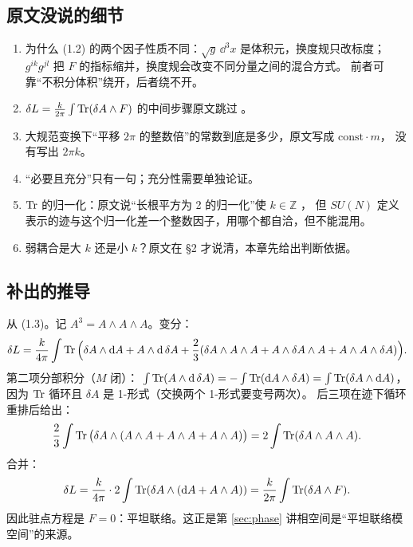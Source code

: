 \subsection{原文没说的细节}
\begin{enumerate}[label=G2.\arabic*,leftmargin=*]
  \item 为什么 (1.2) 的两个因子性质不同：$\sqrt g\,\dd^3x$ 是体积元，换度规只改标度；
        $g^{ik}g^{jl}$ 把 $F$ 的指标缩并，换度规会改变不同分量之间的混合方式。
        前者可靠“不积分体积”绕开，后者绕不开。\ours
  \item $\delta L=\frac{k}{2\pi}\int\operatorname{Tr}(\delta A\wedge F)$ 的中间步骤原文跳过 。
  \item 大规范变换下“平移 $2\pi$ 的整数倍”的常数到底是多少，原文写成 $\text{const}\cdot m$，
        没有写出 $2\pi k$。\ours
  \item “必要且充分”只有一句；充分性需要单独论证。
  \item $\operatorname{Tr}$ 的归一化：原文说“长根平方为 2 的归一化”使 $k\in\mathbb Z$ ，
        但 $SU(N)$ 定义表示的迹与这个归一化差一个整数因子，用哪个都自洽，但不能混用。
  \item 弱耦合是大 $k$ 还是小 $k$？原文在 \S2 才说清，本章先给出判断依据。
\end{enumerate}

\subsection{补出的推导}

\begin{derivation}[D-2.1：变分]
从 (1.3)。记 $A^3=A\wedge A\wedge A$。变分：
\[
\delta L=\frac{k}{4\pi}\int\operatorname{Tr}\Big(\delta A\wedge \mathrm{d} A+A\wedge \mathrm{d}\,\delta A
+\frac23(\delta A\wedge A\wedge A+A\wedge\delta A\wedge A+A\wedge A\wedge\delta A)\Big).
\]
第二项分部积分（$M$ 闭）：
$\int\operatorname{Tr}(A\wedge\mathrm{d}\,\delta A)=-\int\operatorname{Tr}(\mathrm{d} A\wedge\delta A)=\int\operatorname{Tr}(\delta A\wedge\mathrm{d} A)$，
因为 $\operatorname{Tr}$ 循环且 $\delta A$ 是 1-形式（交换两个 1-形式要变号两次）。
后三项在迹下循环重排后给出：
\[
\frac23\int\operatorname{Tr}\big(\delta A\wedge(A\wedge A+A\wedge A+A\wedge A)\big)
=2\int\operatorname{Tr}(\delta A\wedge A\wedge A).
\]
合并：
\[
\delta L=\frac{k}{4\pi}\cdot 2\int\operatorname{Tr}(\delta A\wedge(\mathrm{d} A+A\wedge A))
=\frac{k}{2\pi}\int\operatorname{Tr}(\delta A\wedge F).
\]
因此驻点方程是 $F=0$：平坦联络。这正是第 \ref{sec:phase} 讲相空间是“平坦联络模空间”的来源。
\end{derivation}

